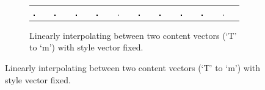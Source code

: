 \begin{figure}
	\begin{subfigure}[t]{\textwidth}
	\begin{tabu} to \textwidth {XXXXXXXXXX}
		\includegraphics[width=0.09\textwidth]{tensors/sandc/interp/output0} &
		\includegraphics[width=0.09\textwidth]{tensors/sandc/interp/output1} &
		\includegraphics[width=0.09\textwidth]{tensors/sandc/interp/output2} &
		\includegraphics[width=0.09\textwidth]{tensors/sandc/interp/output3} &
		\includegraphics[width=0.09\textwidth]{tensors/sandc/interp/output4} &
		\includegraphics[width=0.09\textwidth]{tensors/sandc/interp/output5} &
		\includegraphics[width=0.09\textwidth]{tensors/sandc/interp/output6} &
		\includegraphics[width=0.09\textwidth]{tensors/sandc/interp/output7} &
		\includegraphics[width=0.09\textwidth]{tensors/sandc/interp/output8} &
		\includegraphics[width=0.09\textwidth]{tensors/sandc/interp/output9} 
	\end{tabu}
	\caption{Linearly interpolating between two content vectors (`T' to `m') with style vector
			 fixed.}
	\end{subfigure}
	

\end{figure}
